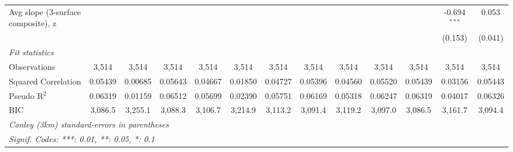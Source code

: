 \begin{table}[htbp]
\begin{tabular}{lcccccccccccc}
      Avg slope (3-surface composite), z &                &         &                &                &               &                &                &                &                &                & -0.694$^{***}$ & 0.053\\   
                                         &                &         &                &                &               &                &                &                &                &                & (0.153)        & (0.041)\\   
      \midrule
      \emph{Fit statistics}\\
      Observations                       & 3,514          & 3,514   & 3,514          & 3,514          & 3,514         & 3,514          & 3,514          & 3,514          & 3,514          & 3,514          & 3,514          & 3,514\\  
      Squared Correlation                & 0.05439        & 0.00685 & 0.05643        & 0.04667        & 0.01850       & 0.04727        & 0.05396        & 0.04560        & 0.05520        & 0.05439        & 0.03156        & 0.05443\\  
      Pseudo R$^2$                       & 0.06319        & 0.01159 & 0.06512        & 0.05699        & 0.02390       & 0.05751        & 0.06169        & 0.05318        & 0.06247        & 0.06319        & 0.04017        & 0.06326\\  
      BIC                                & 3,086.5        & 3,255.1 & 3,088.3        & 3,106.7        & 3,214.9       & 3,113.2        & 3,091.4        & 3,119.2        & 3,097.0        & 3,086.5        & 3,161.7        & 3,094.4\\  
      \midrule \midrule
      \multicolumn{13}{l}{\emph{Conley (3km) standard-errors in parentheses}}\\
      \multicolumn{13}{l}{\emph{Signif. Codes: ***: 0.01, **: 0.05, *: 0.1}}\\
   \end{tabular}
\end{table}


